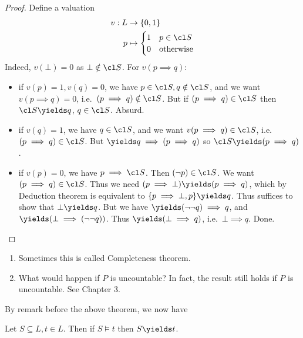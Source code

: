 \documentclass[a4paper]{article}
\begin{document}
\begin{proof}
  Define a valuation
  \begin{align*}
    v: L &\to \{0, 1\} \\
    p &\mapsto
        \begin{cases}
          1 & p \in \cl S \\
          0 & \text{otherwise}
        \end{cases}
  \end{align*}
  Indeed, \(v(\bot) = 0\) as \(\bot \notin \cl S\). For \(v(p \implies q)\):
  \begin{itemize}
  \item if \(v(p) = 1, v(q) = 0\), we have \(p \in \cl S, q \notin \cl S\), and we want \(v(p \implies q) = 0\), i.e.\ \((p \implies q) \notin \cl S\). But if \((p \implies q) \in \cl S\) then \(\cl S \yields q\), \(q \in \cl S\). Absurd.
  \item if \(v(q) = 1\), we have \(q \in \cl S\), and we want \(v(p \implies q) \in \cl S\), i.e.\ \((p \implies q) \in \cl S\). But \(\yields q \implies (p \implies q)\) so \(\cl S \yields (p \implies q)\).
  \item if \(v(p) = 0\), we have \(p \implies \cl S\). Then \((\neg p) \in \cl S\). We want \((p \implies q) \in \cl S\). Thus we need \((p \implies \bot) \yields (p \implies q)\), which by Deduction theorem is equivalent to \(\{p \implies \bot, p\} \yields q\). Thus suffices to show that \(\bot \yields q\). But we have \(\yields (\neg \neg q) \implies q\), and \(\yields (\bot \implies (\neg \neg q))\). Thus \(\yields (\bot \implies q)\), i.e.\ \(\bot \implies q\). Done.
  \end{itemize}
\end{proof}

\begin{remark}\leavevmode
  \begin{enumerate}
  \item Sometimes this is called Completeness theorem.
  \item What would happen if \(P\) is uncountable? In fact, the result still holds if \(P\) is uncountable. See Chapter 3.
  \end{enumerate}
\end{remark}

By remark before the above theorem, we now have

\begin{corollary}[Adequacy]
  Let \(S \subseteq L, t \in L\). Then if \(S \models t\) then \(S \yields t\).
\end{corollary}
\end{document}
